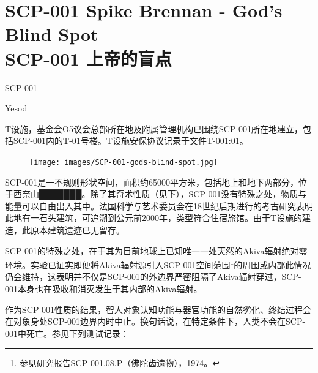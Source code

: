 \chapter[SCP-001 上帝的盲点]{
    SCP-001 Spike Brennan - God's Blind Spot\\
    SCP-001 上帝的盲点
}

\label{chap:SCP-001.gods.blind.spot}

SCP-001

Yesod

T设施，基金会O5议会总部所在地及附属管理机构已围绕SCP-001所在地建立，包括SCP-001内的T-01号楼。T设施安保协议记录于文件T-001:01。

\begin{figure}[H]
    \centering
    \texttt{[image: images/SCP-001-gods-blind-spot.jpg]}
    \caption*{}
\end{figure}

SCP-001是一不规则形状空间，面积约65000平方米，包括地上和地下两部分，位于西奈山███████。除了其奇术性质（见下），SCP-001没有特殊之处，物质与能量可以自由出入其中。法国科学与艺术委员会在18世纪后期进行的考古研究表明此地有一石头建筑，可追溯到公元前2000年，类型符合住宿旅馆。由于T设施的建造，此原本建筑遗迹已无留存。

SCP-001的特殊之处，在于其为目前地球上已知唯一一处天然的Akiva辐射绝对零环境。实验已证实即便将Akiva辐射源引入SCP-001空间范围\footnote{参见研究报告SCP-001.08.P（佛陀齿遗物），1974。}的周围或内部此情况仍会维持，这表明并不仅是SCP-001的外边界严密阻隔了Akiva辐射穿过，SCP-001本身也在吸收和消灭发生于其内部的Akiva辐射。

作为SCP-001性质的结果，智人对象认知功能与器官功能的自然劣化、终结过程会在对象身处SCP-001边界内时中止。换句话说，在特定条件下，人类不会在SCP-001中死亡。参见下列测试记录：

